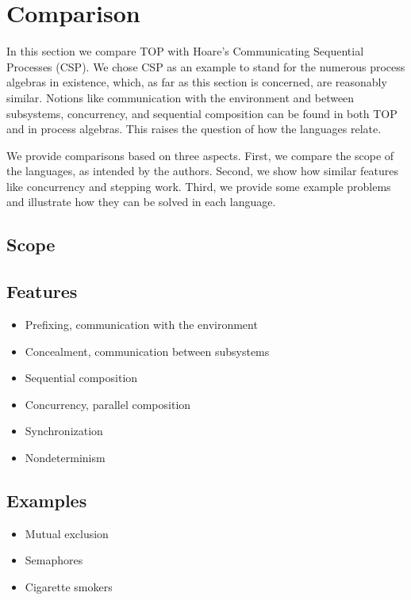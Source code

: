 
\section{Comparison}

In this section we compare TOP with Hoare's Communicating Sequential Processes (CSP).
We chose CSP as an example to stand for the numerous process algebras in existence, which, as far as this section is concerned, are reasonably similar.
Notions like communication with the environment and between subsystems, concurrency, and sequential composition can be found in both TOP and in process algebras.
This raises the question of how the languages relate.

We provide comparisons based on three aspects.
First, we compare the scope of the languages, as intended by the authors.
Second, we show how similar features like concurrency and stepping work.
Third, we provide some example problems and illustrate how they can be solved in each language.

\subsection{Scope}

\subsection{Features}

\begin{itemize}
\item Prefixing, communication with the environment
\item Concealment, communication between subsystems
\item Sequential composition
\item Concurrency, parallel composition
\item Synchronization
\item Nondeterminism
\end{itemize}

\subsection{Examples}

\begin{itemize}
\item Mutual exclusion
\item Semaphores
\item Cigarette smokers
\end{itemize}

